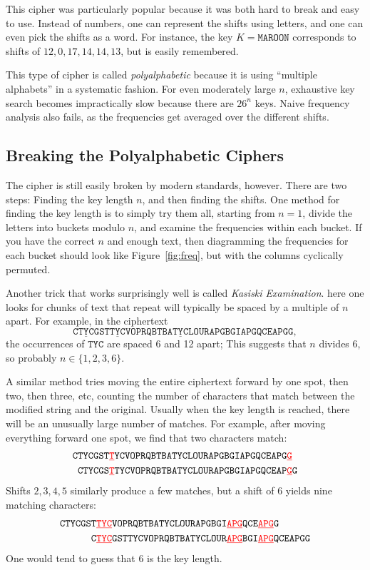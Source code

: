 \documentclass[11pt]{article}
\begin{document}
This cipher was particularly popular because it was both hard to break and easy
to use. Instead of numbers, one can represent the shifts using letters, and one
can even pick the shifts as a word. For instance, the key $K=\mathtt{MAROON}$
corresponds to shifts of $12,0,17,14,14,13$, but is easily remembered.

This type of cipher is called \emph{polyalphabetic} because it is using
``multiple alphabets'' in a systematic fashion. For even moderately
large $n$, exhaustive key search becomes impractically slow because
there are $26^n$ keys. Naive frequency analysis also fails, as the
frequencies get averaged over the different shifts.

\subsection{Breaking the Polyalphabetic Ciphers}

The cipher is still easily broken by modern standards, however. There are two
steps: Finding the key length $n$, and then finding the shifts. One method for
finding the key length is to simply try them all, starting from $n=1$, divide
the letters into buckets modulo $n$, and examine the frequencies within each
bucket. If you have the correct $n$ and enough text, then diagramming the
frequencies for each bucket should look like Figure~\ref{fig:freq}, but with
the columns cyclically permuted.

Another trick that works surprisingly well is called \emph{Kasiski Examination}.
here one looks for chunks of text that repeat will typically be spaced
by a multiple of $n$ apart. For example, in the ciphertext
\[
    \mathtt{C\underline{TYC}GST\underline{TYC}VOPRQBTBA\underline{TYC}LOURAPGBGIAPGQCEAPGG},
\]
the occurrences of $\mathtt{TYC}$ are spaced 6 and 12 apart; This suggests
that $n$ divides $6$, so probably $n\in\{1,2,3,6\}$.

A similar method tries moving the entire ciphertext forward by one spot, then
two, then three, etc, counting the number of characters that match between the
modified string and the original. Usually when the key length is reached,
there will be an unusually large number of matches.
For example, after moving everything forward
one spot, we find that two characters match:
\begin{align*}
    & \mathtt{CTYCGST\underline{\color{red}T}YCVOPRQBTBATYCLOURAPGBGIAPGQCEAPG\underline{\color{red}G}} \\
    & \mathtt{\phantom{\mathtt{X}}CTYCGS\underline{\color{red}T}TYCVOPRQBTBATYCLOURAPGBGIAPGQCEAP\underline{\color{red}G}G} 
\end{align*}
Shifts $2,3,4,5$ similarly produce a few matches, but
a shift of $6$ yields nine matching characters:
\begin{align*}
    & \mathtt{CTYCGST\underline{\color{red}TYC}VOPRQBTBATYCLOURAPGBGI\underline{\color{red}APG}QCE\underline{\color{red}APG}G} \\
    & \mathtt{\phantom{\mathtt{000000}}C\underline{\color{red}TYC}GSTTYCVOPRQBTBATYCLOUR\underline{\color{red}APG}BGI\underline{\color{red}APG}QCEAPGG} 
\end{align*}
One would tend to guess that $6$ is the key length.
\end{document}

